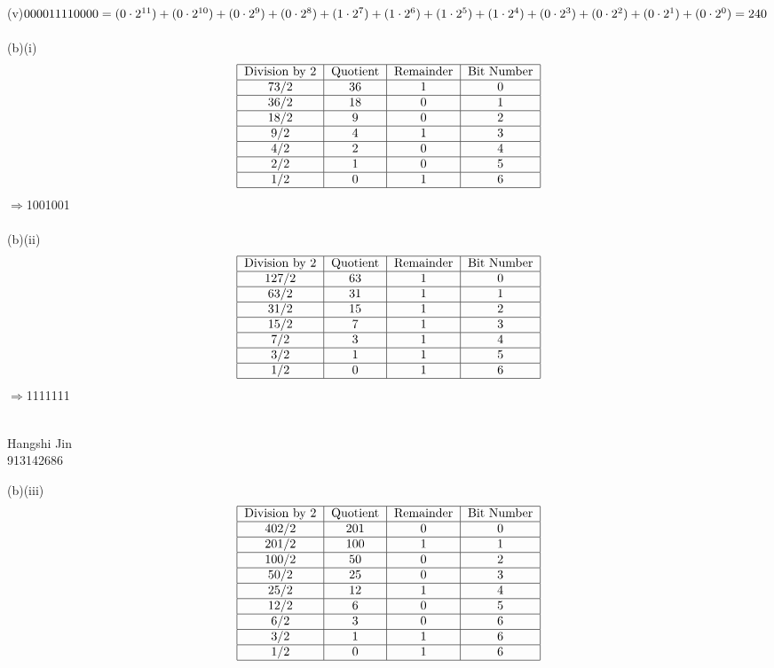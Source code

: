 \documentclass{article}
\begin{document}
\\\\(v)$000011110000 = (0 \cdot 2^{11}) + (0 \cdot 2^{10}) + (0 \cdot 2^9) + (0 \cdot 2^8) + (1 \cdot 2^7) + (1 \cdot 2^6) + (1 \cdot 2^5) \\\\+ (1 \cdot 2^4) + (0 \cdot 2^3) + (0 \cdot 2^2) + (0 \cdot 2^1) + (0 \cdot 2^0) = 240$
\\\\(b)(i)\[\begin{tabular}{|c|c|c|c|}
\hline
\text{Division by 2}&\text{Quotient}&\text{Remainder}&\text{Bit Number}\\
\hline
$73/2$&36&1&0\\
\hline
$36/2$&18&0&1\\
\hline
$18/2$&9&0&2\\
\hline
$9/2$&4&1&3\\
\hline
$4/2$&2&0&4\\
\hline
$2/2$&1&0&5\\
\hline
$1/2$&0&1&6\\
\hline
\end{tabular}\]
$\Rightarrow$1001001
\\\\(b)(ii)\[\begin{tabular}{|c|c|c|c|}
\hline
\text{Division by 2}&\text{Quotient}&\text{Remainder}&\text{Bit Number}\\
\hline
$127/2$&63&1&0\\
\hline
$63/2$&31&1&1\\
\hline
$31/2$&15&1&2\\
\hline
$15/2$&7&1&3\\
\hline
$7/2$&3&1&4\\
\hline
$3/2$&1&1&5\\
\hline
$1/2$&0&1&6\\
\hline
\end{tabular}\]
$\Rightarrow$1111111\\\\
\begin{flushright}Hangshi Jin\\913142686\end{flushright}
(b)(iii)\[\begin{tabular}{|c|c|c|c|}
\hline
\text{Division by 2}&\text{Quotient}&\text{Remainder}&\text{Bit Number}\\
\hline
$402/2$&201&0&0\\
\hline
$201/2$&100&1&1\\
\hline
$100/2$&50&0&2\\
\hline
$50/2$&25&0&3\\
\hline
$25/2$&12&1&4\\
\hline
$12/2$&6&0&5\\
\hline
$6/2$&3&0&6\\
\hline
$3/2$&1&1&6\\
\hline
$1/2$&0&1&6\\
\hline
\end{tabular}\]
\end{document}
